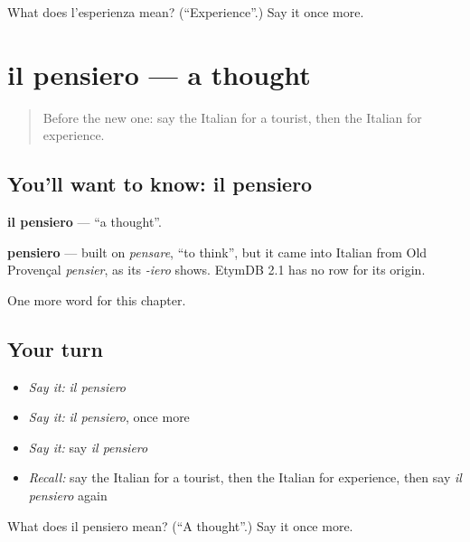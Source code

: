 \begin{tcolorbox}[breakable,colback=teal!4,colframe=teal!35!black,title={Before you move on}]
What does l'esperienza mean? (\textquotedblleft{}Experience\textquotedblright{}.) Say it once more.
\end{tcolorbox}
\section[il pensiero]{il pensiero — a thought}

\label{lesson:IT-C196-pensiero}



\begin{quote}
Before the new one: say the Italian for a tourist, then the Italian for experience.
\end{quote}

\subsection*{You'll want to know: il pensiero}
\textbf{il pensiero} — \textquotedblleft{}a thought\textquotedblright{}.

\begin{cousinweb}
\textbf{pensiero} — built on \emph{pensare}, \textquotedblleft{}to think\textquotedblright{}, but it came into Italian from Old Provençal \emph{pensier}, as its \emph{-iero} shows. EtymDB 2.1 has no row for its origin.
\end{cousinweb}

\begin{grammarlens}[title={What you've built}]
One more word for this chapter.
\end{grammarlens}

\subsection*{Your turn}
\begin{itemize}
\raggedright
  \item \emph{Say it:} \emph{il pensiero}
  \item \emph{Say it:} \emph{il pensiero}, once more
  \item \emph{Say it:} say \emph{il pensiero}
  \item \emph{Recall:} say the Italian for a tourist, then the Italian for experience, then say \emph{il pensiero} again
\end{itemize}

\begin{tcolorbox}[breakable,colback=teal!4,colframe=teal!35!black,title={Before you move on}]
What does il pensiero mean? (\textquotedblleft{}A thought\textquotedblright{}.) Say it once more.
\end{tcolorbox}
